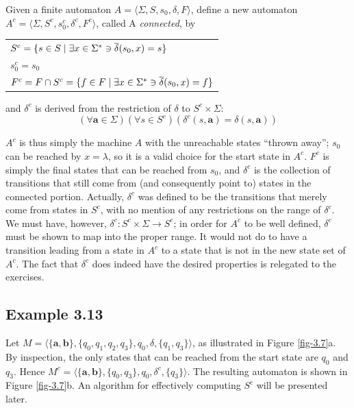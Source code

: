 \begin{dfn}\label{dfn-3.7}
Given a finite automaton $A =\langle\Sigma,S,s_0,\delta,F\rangle$, define a new
automaton $A^c =\langle\Sigma,S^c,s^c_0,\delta^c,F^c\rangle$, called A
\emph{connected}, by
\begin{center}
\begin{tabular}{l}
$S^c =\{s\in S \mid \exists x \in \Sigma^* \ni \overline{\delta}(s_0,x)=s\}$ \\
$s^c_0 = s_0$ \\
$F^c = F \cap S^c =\{f \in F \mid \exists x \in \Sigma^* \ni \overline{\delta}(s_0,x) = f\}$
\end{tabular}
\end{center}
and $\delta^c$ is derived from the restriction of $\delta$ to $S^c\times\Sigma$:
\[(\forall \pmb{a} \in \Sigma)(\forall s \in S^c)(\delta^c(s, \pmb{a}) = \delta(s,\pmb{a})) \]
\end{dfn}

$A^c$ is thus simply the machine $A$ with the unreachable states ``thrown
away''; $s_0$ can be reached by $x = \lambda$, so it is a valid choice for the
start state in $A^c$. $F^c$ is simply the final states that can be reached from
$s_0$, and $\delta^c$ is the collection of transitions that still come from (and
consequently point to) states in the connected portion. Actually, $\delta^c$ was
defined to be the transitions that merely come from states in $S^c$, with no
mention of any restrictions on the range of $\delta^c$. We must have, however,
$\delta^c: S^c \times \Sigma \rightarrow S^c$; in order for $A^c$ to be well
defined, $\delta^c$ must be shown to map into the proper range. It would not do to
have a transition leading from a state in $A^c$ to a state that is not in the
new state set of $A^c$. The fact that $\delta^c$ does indeed have the desired
properties is relegated to the exercises.

\subsection*{Example 3.13}

Let $M =\langle\{\pmb{a},\pmb{b}\},\{q_0,q_1,q_2,q_3\},q_0,\delta,\{q_1,q_3\}\rangle$, as
illustrated in Figure \ref{fig-3.7}a. By inspection, the only states that can be reached
from the start state are $q_0$ and $q_3$. Hence
$M^c =\langle\{\pmb{a},\pmb{b}\},\{q_0,q_3\},q_0,\delta^c,\{q_3\}\rangle$. The resulting
automaton is shown in Figure \ref{fig-3.7}b. An algorithm for effectively computing $S^c$
will be presented later.

